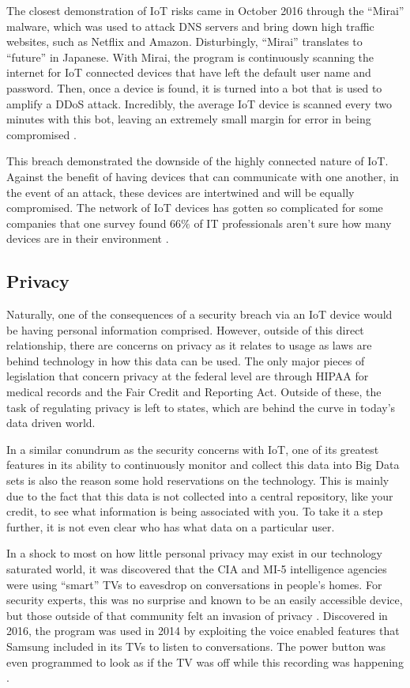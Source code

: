 \documentclass[sigconf]{acmart}
\begin{document}
The closest demonstration of IoT risks came in October 2016 through the ``Mirai'' malware, which was used to attack DNS servers and bring down high traffic websites, such as Netflix and Amazon. Disturbingly, ``Mirai'' translates to ``future'' in Japanese.  With Mirai, the program is continuously scanning the internet for IoT connected devices that have left the default user name and password. Then, once a device is found, it is turned into a bot that is used to amplify a DDoS attack. Incredibly, the average IoT device is scanned every two minutes with this bot, leaving an extremely small margin for error in being compromised \cite{botnet}.

This breach demonstrated the downside of the highly connected nature of IoT. Against the benefit of having devices that can communicate with one another, in the event of an attack, these devices are intertwined and will be equally compromised. The network of IoT devices has gotten so complicated for some companies that one survey found $66\%$ of IT professionals aren't sure how many devices are in their environment \cite{mirai}. 

\subsection{Privacy}

Naturally, one of the consequences of a security breach via an IoT device would be having personal information comprised. However, outside of this direct relationship, there are concerns on privacy as it relates to usage as laws are behind technology in how this data can be used. The only major pieces of legislation that concern privacy at the federal level are through HIPAA for medical records and the Fair Credit and Reporting Act. Outside of these, the task of regulating privacy is left to states, which are behind the curve in today's data driven world. 

In a similar conundrum as the security concerns with IoT, one of its greatest features in its ability to continuously monitor and collect this data into Big Data sets is also the reason some hold reservations on the technology. This is mainly due to the fact that this data is not collected into a central repository, like your credit, to see what information is being associated with you. To take it a step further, it is not even clear who has what data on a particular user.

In a shock to most on how little personal privacy may exist in our technology saturated world, it was discovered that the CIA and MI-5 intelligence agencies were using ``smart'' TVs to eavesdrop on conversations in people's homes. For security experts, this was no surprise and known to be an easily accessible device, but those outside of that community felt an invasion of privacy \cite{smarttvdumb}. Discovered in 2016, the program was used in 2014 by exploiting the voice enabled features that Samsung included in its TVs to listen to conversations. The power button was even programmed to look as if the TV was off while this recording was happening \cite{smarttvspy}. 
\end{document}
